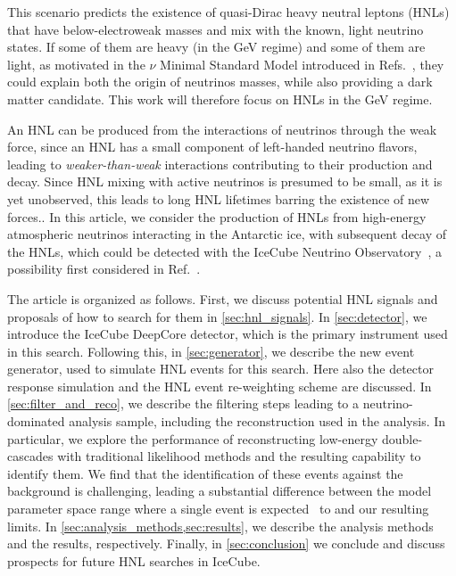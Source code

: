 \documentclass[
    aps,
    prd,
    reprint,
    amsmath,
    amssymb,
    nofootinbib,
    superscriptaddress,
    floatfix
]{revtex4-2}
\begin{document}
This scenario predicts the existence of quasi-Dirac heavy neutral leptons (HNLs) that have below-electroweak masses and mix with the known, light neutrino states.
If some of them are heavy (in the GeV regime) and some of them are light, as motivated in the $\nu$ Minimal Standard Model introduced in Refs.~\cite{ASAKA200517, ASAKA2005151},
they could explain both the origin of neutrinos masses, while also providing a dark matter candidate. This work will therefore focus on HNLs in the GeV regime.

An HNL can be produced from the interactions of neutrinos through the weak force, since an HNL has a small component of left-handed neutrino flavors, leading to \textit{weaker-than-weak} interactions contributing to their production and decay.
Since HNL mixing with active neutrinos is presumed to be small, as it is yet unobserved, this leads to long HNL lifetimes barring the existence of new forces..
In this article, we consider the production of HNLs from high-energy atmospheric neutrinos interacting in the Antarctic ice, with subsequent decay of the HNLs, which could be detected with the IceCube Neutrino Observatory~\cite{IceCube:2016zyt}, a possibility first considered in Ref.~\cite{Coloma:2017ppo}.

The article is organized as follows.
First, we discuss potential HNL signals and proposals of how to search for them in \cref{sec:hnl_signals}.
In \cref{sec:detector}, we introduce the IceCube DeepCore detector, which is the primary instrument used in this search.
Following this, in \cref{sec:generator}, we describe the new event generator, used to simulate HNL events for this search.
Here also the detector response simulation and the HNL event re-weighting scheme are discussed.
In \cref{sec:filter_and_reco}, we describe the filtering steps leading to a neutrino-dominated analysis sample, including the reconstruction used in the analysis.
In particular, we explore the performance of reconstructing low-energy double-cascades with traditional likelihood methods and the resulting capability to identify them.
We find that the identification of these events against the background is challenging, leading a substantial difference between the model parameter space range where a single event is expected~\cite{Coloma:2017ppo, Boiarska:2021yho} to and our resulting limits.
In \cref{sec:analysis_methods,sec:results}, we describe the analysis methods and the results, respectively. 
Finally, in \cref{sec:conclusion} we conclude and discuss prospects for future HNL searches in IceCube.
\end{document}
